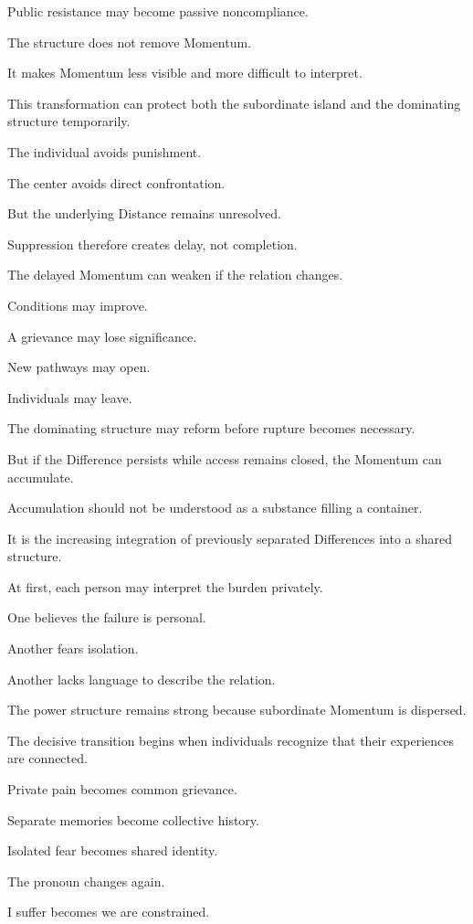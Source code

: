 Public resistance may become passive noncompliance.

The structure does not remove Momentum.

It makes Momentum less visible and more difficult to interpret.

This transformation can protect both the subordinate island and the dominating structure temporarily.

The individual avoids punishment.

The center avoids direct confrontation.

But the underlying Distance remains unresolved.

Suppression therefore creates delay, not completion.

The delayed Momentum can weaken if the relation changes.

Conditions may improve.

A grievance may lose significance.

New pathways may open.

Individuals may leave.

The dominating structure may reform before rupture becomes necessary.

But if the Difference persists while access remains closed, the Momentum can accumulate.

Accumulation should not be understood as a substance filling a container.

It is the increasing integration of previously separated Differences into a shared structure.

At first, each person may interpret the burden privately.

One believes the failure is personal.

Another fears isolation.

Another lacks language to describe the relation.

The power structure remains strong because subordinate Momentum is dispersed.

The decisive transition begins when individuals recognize that their experiences are connected.

Private pain becomes common grievance.

Separate memories become collective history.

Isolated fear becomes shared identity.

The pronoun changes again.

I suffer becomes we are constrained.

